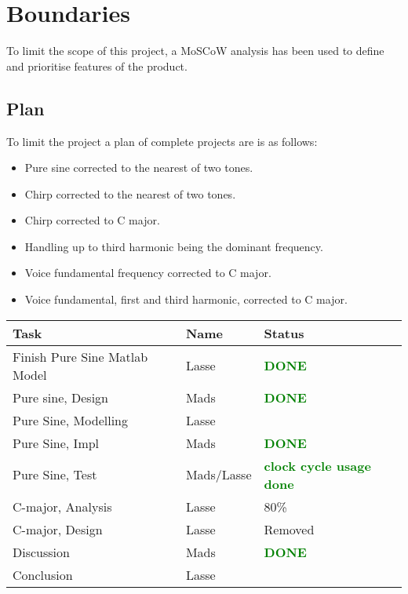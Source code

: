 
\chapter{Boundaries}
\label{sec:Boundaries}
To limit the scope of this project, a MoSCoW analysis has been used to define and prioritise features of the product.

\section{Plan}
To limit the project a plan of complete projects are is as follows:

\begin{itemize}
	\item Pure sine corrected to the nearest of two tones.
	\item Chirp corrected to the nearest of two tones.
	\item Chirp corrected to C major.
	\item Handling up to third harmonic being the dominant frequency.
	\item Voice fundamental frequency corrected to C major.
	\item Voice fundamental, first and third harmonic, corrected to C major.
\end{itemize}

\begin{table}
	\centering
	\begin{tabular}{l l l}
		\toprule
		Task & Name & Status \\
		\midrule
		Finish Pure Sine Matlab Model & Lasse & \textcolor{green}{\textbf{DONE}} \\
		Pure sine, Design & Mads & \textcolor{green}{\textbf{DONE}}\\
		Pure Sine, Modelling & Lasse & \\
		Pure Sine, Impl & Mads & \textcolor{green}{\textbf{DONE}} \\
		Pure Sine, Test & Mads/Lasse & \textcolor{green}{\textbf{clock cycle usage done}}\\
		C-major, Analysis & Lasse & 80\% \\
		C-major, Design & Lasse & Removed \\
		Discussion & Mads & \textcolor{green}{\textbf{DONE}}\\
		Conclusion & Lasse & \\
		\bottomrule
	\end{tabular}
\end{table}
